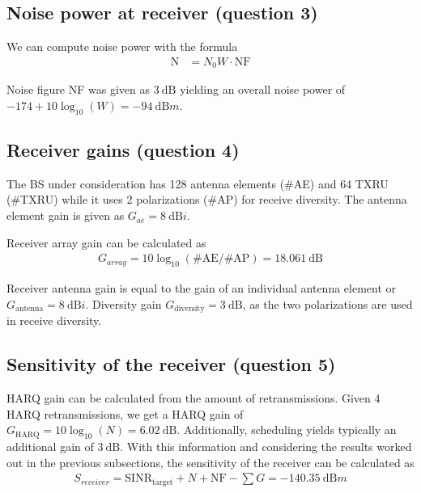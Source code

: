 \documentclass{article}
\begin{document}
\subsection{Noise power at receiver (question 3)}

We can compute noise power with the formula 
\begin{align*}
     \mathrm{N} &= N_0 W \cdot \mathrm{NF}
\end{align*}

Noise figure NF was given as \(\SI{3}{\deci\bel}\) yielding an overall noise power of \(-174 + 10 \log_{10} (W) = \SI{-94}{\deci\bel m}\).

\subsection{Receiver gains (question 4)}

The BS under consideration has 128 antenna elements (\#AE) and 64 TXRU (\#TXRU) while it uses 2 polarizations (\#AP) for receive diversity. The antenna element gain is given as \(G_{ae} =  \SI{8}{\deci\bel i}\).

Receiver array gain can be calculated as
\begin{align*}
    G_{array} = 10 \log_{10} (\mathrm{\#AE}/\mathrm{\#AP}) = \SI{18.061}{\deci\bel}
\end{align*}

Receiver antenna gain is equal to the gain of an individual antenna element or \(G_{\mathrm{antenna}} = \SI{8}{\deci\bel i}\). Diversity gain \(G_{\mathrm{diversity}} = \SI{3}{\deci\bel}\), as the two polarizations are used in receive diversity.

\subsection{Sensitivity of the receiver (question 5)}

HARQ gain can be calculated from the amount of retransmissions. Given 4 HARQ retransmissions, we get a HARQ gain of \(G_{\mathrm{HARQ}} = 10 \log_{10} (N) = \SI{6.02}{\deci\bel}\). Additionally, scheduling yields typically an additional gain of  \(\SI{3}{\deci\bel}\). With this information and considering the results worked out in the previous subsections, the sensitivity of the receiver can be calculated as
\begin{align*}
    S_{receiver} = \mathrm{SINR_{target}} + N + \mathrm{NF} - \sum G = \SI{-140.35}{\deci\bel m}
\end{align*}
\end{document}
